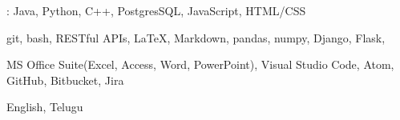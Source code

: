 
\begin{cvparagraph}
    : Java, Python, C++, PostgresSQL, JavaScript, HTML/CSS

     git, bash, RESTful APIs, LaTeX, Markdown, pandas, numpy, Django, Flask, 


     MS Office Suite(Excel, Access, Word, PowerPoint), Visual Studio Code, Atom, GitHub, Bitbucket, Jira

     English, Telugu
\end{cvparagraph}
